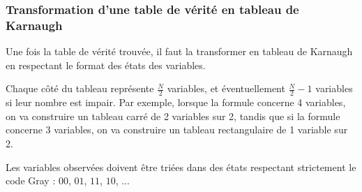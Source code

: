 \documentclass[11pt,a4paper]{article}
\begin{document}
\medskip


\subsubsection{Transformation d'une table de vérité en tableau de Karnaugh}

\medskip

Une fois la table de vérité trouvée, il faut la transformer en tableau de Karnaugh en respectant le format des états des variables.

\smallskip

Chaque côté du tableau représente $ \frac{N}{2} $ variables, et éventuellement $ \frac{N}{2} - 1 $ variables si leur nombre est impair.
Par exemple, lorsque la formule concerne 4 variables, on va construire un tableau \og carré \fg{} de 2 variables sur 2, tandis que si la formule concerne 3 variables, on va construire un tableau \og rectangulaire \fg{} de 1 variable sur 2.

\smallskip

Les variables observées doivent être triées dans des états respectant strictement le code Gray : $ 00 $, $ 01 $, $ 11 $, $ 10 $, ...

\medskip
\end{document}
